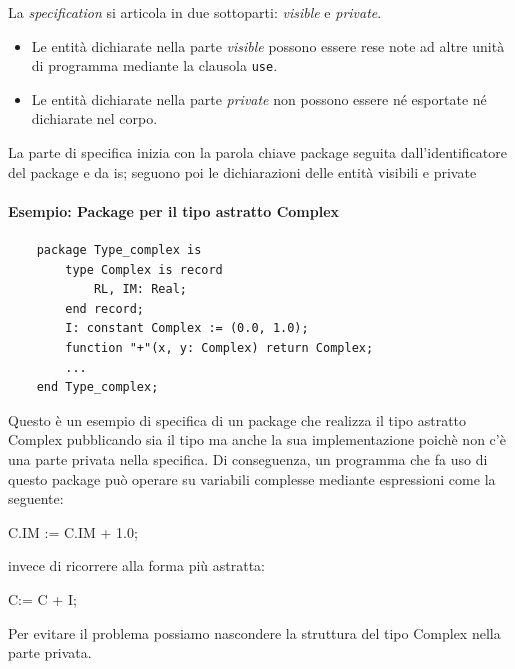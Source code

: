 \documentclass{article}
\begin{document}
	La \textit{specification} si articola in due sottoparti: \textit{visible} e \textit{private}.
	\begin{itemize}
	    \item Le entità dichiarate nella parte \textit{visible} possono essere rese note ad altre unità di programma mediante la clausola \texttt{use}.
	    \item Le entità dichiarate nella parte \textit{private} non possono essere né esportate né dichiarate nel corpo.
	\end{itemize}
	La parte di specifica inizia con la parola chiave package seguita dall'identificatore del package e da is; seguono poi le dichiarazioni delle entità visibili e private
	\paragraph{Esempio: Package per il tipo astratto Complex}
	\begin{verbatim}
	package Type_complex is
	    type Complex is record
	        RL, IM: Real;
	    end record;
	    I: constant Complex := (0.0, 1.0);
	    function "+"(x, y: Complex) return Complex;
	    ...
	end Type_complex;
	\end{verbatim}
	Questo è un esempio di specifica di un package che realizza il tipo astratto Complex pubblicando sia il tipo ma anche la sua implementazione poichè non c'è una parte privata nella specifica. Di conseguenza, un programma che fa uso di questo package può operare su variabili complesse mediante espressioni come la seguente:
	\begin{center}
		C.IM := C.IM + 1.0;		
	\end{center}
	invece di ricorrere alla forma più astratta:
	\begin{center}
		C:= C + I;
	\end{center}
	Per evitare il problema possiamo nascondere la struttura del tipo Complex nella parte privata.
\end{document}
